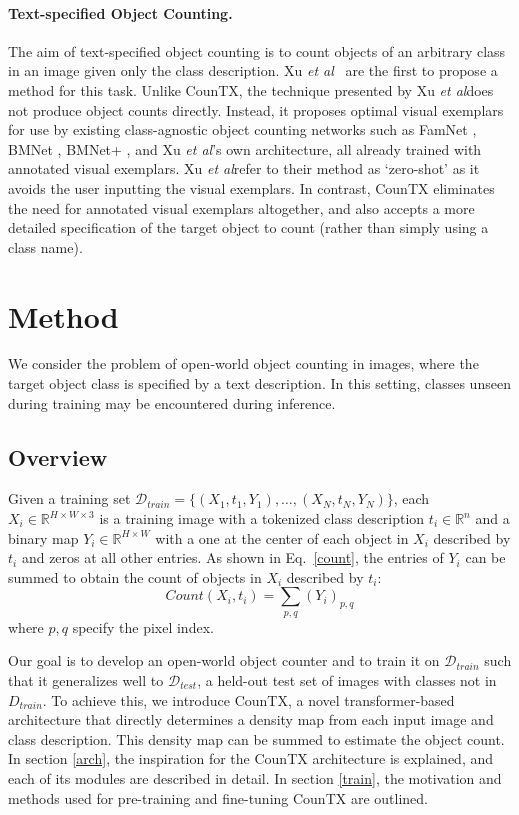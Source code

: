 \documentclass{bmvc2k}
\def\etal{\emph{et al}\bmvaOneDot}
\begin{document}
\paragraph{Text-specified Object Counting.}  The aim of text-specified object counting is to count objects of an arbitrary class in an image given only the class description. Xu \etal~\cite{Xu2023ZeroshotOC} are the first to propose a method for this task. Unlike CounTX, the technique presented by Xu \etal does not produce object counts directly. Instead, it proposes optimal visual exemplars for use by existing class-agnostic object counting networks such as FamNet \cite{m_Ranjan-etal-CVPR21}, BMNet \cite{Shi2022RepresentCA}, BMNet+ \cite{Shi2022RepresentCA}, and Xu \etal's own architecture, all already trained with annotated visual exemplars. Xu \etal  refer to their method as `zero-shot' as it avoids the user inputting the visual exemplars. In contrast, CounTX eliminates the need for annotated visual exemplars altogether, and also accepts a more detailed specification of the target object to count (rather than simply using a class name).
 \section{Method}
We consider the problem of open-world object counting in images, where the target object class is specified by a text description. In this setting, classes unseen during training may be encountered during inference.

\subsection{Overview}
Given a training set $\mathcal{D}_{train} = \{(X_{1}, t_{1}, Y_{1}), \dots, (X_{N}, t_{N}, Y_{N})\}$, each $X_{i} \in \mathbb{R}^{H \times W \times 3}$ is a training image with a tokenized class description $t_{i} \in \mathbb{R}^{n}$ and a binary map $Y_{i} \in \mathbb{R}^{H \times W}$ with a one at the center of each object in $X_{i}$ described by $t_{i}$ and zeros at all other entries. As shown in Eq.~\ref{count}, the entries of $Y_{i}$ can be summed to obtain the count of objects in $X_{i}$ described by $t_{i}$:
\begin{equation}\label{count}
Count(X_{i}, t_{i}) = \sum_{p, q}(Y_{i})_{p, q}
\end{equation}
where $p,q$ specify the pixel index.

Our goal is to develop an open-world object counter and to train it on $\mathcal{D}_{train}$ such that it generalizes well to $\mathcal{D}_{test}$, a held-out test set of images with classes not in $D_{train}$. To achieve this, we introduce CounTX, a novel transformer-based architecture that directly determines a density map from each input image and class description. This density map can be summed to estimate the object count. In section \ref{arch}, the inspiration for the CounTX architecture is explained, and each of its modules are described in detail. In section \ref{train}, the motivation and methods used for pre-training and fine-tuning CounTX are outlined.
\end{document}

